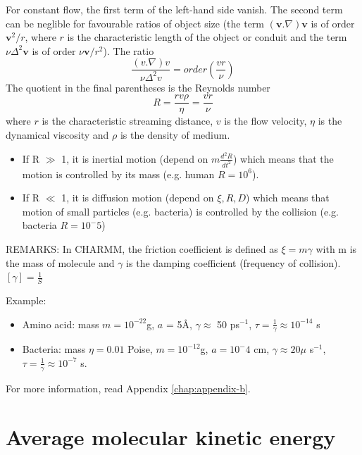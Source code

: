 For constant flow, the first term of the left-hand side vanish.  The
second term can be neglible for favourable ratios of object size (the
term $(\mathbf{v}. \nabla)\mathbf{v}$ is of order $\mathbf{v}^2/r$,
where $r$ is the characteristic length of the object or conduit and
the term $\nu \Delta^2\mathbf{v}$ is of order $\nu
\mathbf{v}/r^2$). The ratio
\begin{equation}
  \frac{(v.\nabla)v}{\nu \Delta^2v} = order \left(  \frac{vr}{\nu}        \right)
\end{equation}
The quotient in the final parentheses is the Reynolds number
\begin{equation}
  R = \frac{rv\rho}{\eta} = \frac{vr}{\nu}
\end{equation}
where $r$ is the characteristic streaming distance, $v$ is the flow
velocity, $\eta$ is the dynamical viscosity and $\rho$ is the density
of medium.
\begin{itemize}
\item If R $\gg$ 1, it is inertial motion (depend on $m
  \frac{d^2R}{dt^2}$) which means that the motion is controlled by its
  mass (e.g. human $R=10^6$).
\item If R $\ll$ 1, it is diffusion motion (depend on $\xi, R, D$)
  which means that motion of small particles (e.g. bacteria) is
  controlled by the collision (e.g. bacteria $R=10^-5$)
\end{itemize}

REMARKS: In CHARMM, the friction coefficient is defined as $\xi = m \gamma$
with m is the mass of molecule and $\gamma$ is the damping coefficient
(frequency of collision). $[\gamma] = \frac{1}{S}$

Example:

\begin{itemize}
\item Amino acid: mass $m = 10^{-22}$g, $a$ = 5\AA, $\gamma \approx$ 50
  ps$^{-1}$, $\tau = \frac{1}{\gamma} \approx 10^{-14}$ s
\item Bacteria: mass $\eta = 0.01$ Poise, $m = 10^{-12}$g, $a = 10^-4$ cm,
  $\gamma \approx 20 \mu$ s$^{-1}$, $\tau = \frac{1}{\gamma} \approx
  10^{-7}$ s.
\end{itemize}

For more information, read Appendix \ref{chap:appendix-b}.


\section{Average molecular kinetic energy}


